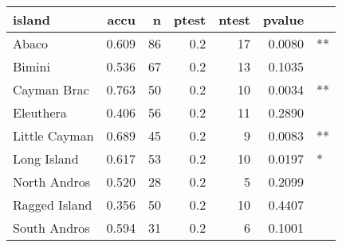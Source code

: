 
\begin{tabular}{l|r|r|r|r|r|l}
\hline
island & accu & n & ptest & ntest & pvalue & \\
\hline
Abaco & 0.609 & 86 & 0.2 & 17 & 0.0080 & **\\
\hline
Bimini & 0.536 & 67 & 0.2 & 13 & 0.1035 & \\
\hline
Cayman Brac & 0.763 & 50 & 0.2 & 10 & 0.0034 & **\\
\hline
Eleuthera & 0.406 & 56 & 0.2 & 11 & 0.2890 & \\
\hline
Little Cayman & 0.689 & 45 & 0.2 & 9 & 0.0083 & **\\
\hline
Long Island & 0.617 & 53 & 0.2 & 10 & 0.0197 & *\\
\hline
North Andros & 0.520 & 28 & 0.2 & 5 & 0.2099 & \\
\hline
Ragged Island & 0.356 & 50 & 0.2 & 10 & 0.4407 & \\
\hline
South Andros & 0.594 & 31 & 0.2 & 6 & 0.1001 & \\
\hline
\end{tabular}
